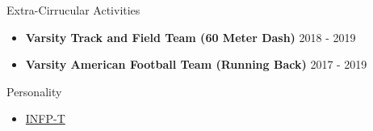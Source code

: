 \documentclass{resume} %
\begin{document}


\begin{rSection}{Extra-Cirrucular Activities} 
\begin{itemize}
    \item 	\textbf{Varsity Track and Field Team (60  Meter Dash) } \hfill 2018 - 2019\\
    \item	\textbf{Varsity American Football Team (Running Back) } \hfill 2017 - 2019\\
\end{itemize}


\end{rSection}

\begin{rSection}{Personality} 
\begin{itemize}
    \item \href{https://www.16personalities.com/infp-personality}{INFP-T}
\end{itemize}


\end{rSection}
\end{document}
